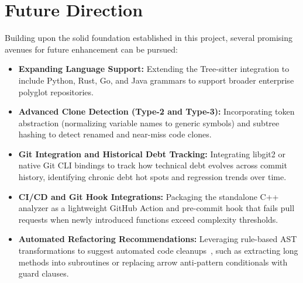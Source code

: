 \section{Future Direction}
Building upon the solid foundation established in this project, several promising avenues for future enhancement can be pursued:
\begin{itemize}
    \item \textbf{Expanding Language Support:} Extending the Tree-sitter integration to include Python, Rust, Go, and Java grammars to support broader enterprise polyglot repositories.
    \item \textbf{Advanced Clone Detection (Type-2 and Type-3):} Incorporating token abstraction (normalizing variable names to generic symbols) and subtree hashing to detect renamed and near-miss code clones.
    \item \textbf{Git Integration and Historical Debt Tracking:} Integrating libgit2 or native Git CLI bindings to track how technical debt evolves across commit history, identifying chronic debt hot spots and regression trends over time.
    \item \textbf{CI/CD and Git Hook Integrations:} Packaging the standalone C++ analyzer as a lightweight GitHub Action and pre-commit hook that fails pull requests when newly introduced functions exceed complexity thresholds.
    \item \textbf{Automated Refactoring Recommendations:} Leveraging rule-based AST transformations to suggest automated code cleanups~\cite{fowler1999}, such as extracting long methods into subroutines or replacing arrow anti-pattern conditionals with guard clauses.
\end{itemize}

